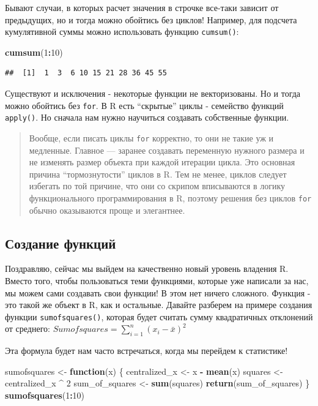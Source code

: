 \documentclass[]{book}
\newenvironment{Shaded}{\begin{snugshade}}{\end{snugshade}}
\newcommand{\KeywordTok}[1]{\textcolor[rgb]{0.13,0.29,0.53}{\textbf{#1}}}
\newcommand{\DecValTok}[1]{\textcolor[rgb]{0.00,0.00,0.81}{#1}}
\newcommand{\StringTok}[1]{\textcolor[rgb]{0.31,0.60,0.02}{#1}}
\newcommand{\ControlFlowTok}[1]{\textcolor[rgb]{0.13,0.29,0.53}{\textbf{#1}}}
\newcommand{\OperatorTok}[1]{\textcolor[rgb]{0.81,0.36,0.00}{\textbf{#1}}}
\newcommand{\NormalTok}[1]{#1}
\begin{document}
Бывают случаи, в которых расчет значения в строчке все-таки зависит от
предыдущих, но и тогда можно обойтись без циклов! Например, для подсчета
кумулятивной суммы можно использовать функцию \texttt{cumsum()}:

\begin{Shaded}
\begin{Highlighting}[]
\KeywordTok{cumsum}\NormalTok{(}\DecValTok{1}\OperatorTok{:}\DecValTok{10}\NormalTok{)}
\end{Highlighting}
\end{Shaded}

\begin{verbatim}
##  [1]  1  3  6 10 15 21 28 36 45 55
\end{verbatim}

Существуют и исключения - некоторые функции не векторизованы. Но и тогда
можно обойтись без \texttt{for}. В R есть ``скрытые'' циклы - семейство
функций \texttt{apply()}. Но сначала нам нужно научиться создавать
собственные функции.

\begin{quote}
Вообще, если писать циклы \texttt{for} корректно, то они не такие уж и
медленные. Главное --- заранее создавать переменную нужного размера и не
изменять размер объекта при каждой итерации цикла. Это основная причина
``тормознутости'' циклов в R. Тем не менее, циклов следует избегать по
той причине, что они со скрипом вписываются в логику функционального
программирования в R, поэтому решения без циклов \texttt{for} обычно
оказываются проще и элегантнее.
\end{quote}

\subsection{Создание функций}\label{newfun}

Поздравляю, сейчас мы выйдем на качественно новый уровень владения R.
Вместо того, чтобы пользоваться теми функциями, которые уже написали за
нас, мы можем сами создавать свои функции! В этом нет ничего сложного.
Функция - это такой же объект в R, как и остальные. Давайте разберем на
примере создания функции \texttt{sumofsquares()}, которая будет считать
сумму квадратичных отклонений от среднего:
\(Sum of squares = \sum_{i=1}^{n}(x_i - \bar{x})^2\)

Эта формула будет нам часто встречаться, когда мы перейдем к статистике!

\begin{Shaded}
\begin{Highlighting}[]
\NormalTok{sumofsquares <-}\StringTok{ }\ControlFlowTok{function}\NormalTok{(x) \{}
\NormalTok{  centralized_x <-}\StringTok{ }\NormalTok{x }\OperatorTok{-}\StringTok{ }\KeywordTok{mean}\NormalTok{(x)}
\NormalTok{  squares <-}\StringTok{ }\NormalTok{centralized_x }\OperatorTok{^}\StringTok{ }\DecValTok{2}
\NormalTok{  sum_of_squares <-}\StringTok{ }\KeywordTok{sum}\NormalTok{(squares)}
  \KeywordTok{return}\NormalTok{(sum_of_squares)}
\NormalTok{\}}
\KeywordTok{sumofsquares}\NormalTok{(}\DecValTok{1}\OperatorTok{:}\DecValTok{10}\NormalTok{)}
\end{Highlighting}
\end{Shaded}
\end{document}
